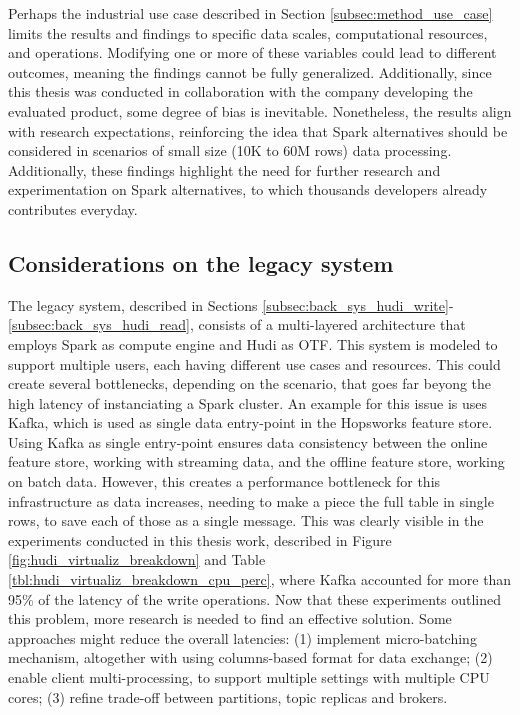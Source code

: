 Perhaps the industrial use case described in Section \ref{subsec:method_use_case} limits the results and findings to specific data scales, computational resources, and operations. Modifying one or more of these variables could lead to different outcomes, meaning the findings cannot be fully generalized. Additionally, since this thesis was conducted in collaboration with the company developing the evaluated product, some degree of bias is inevitable. Nonetheless, the results align with research expectations, reinforcing the idea that Spark alternatives should be considered in scenarios of small size (10K to 60M rows) data processing. Additionally, these findings highlight the need for further research and experimentation on Spark alternatives, to which thousands developers already contributes everyday.



\subsection{Considerations on the legacy system}
The legacy system, described in Sections \ref{subsec:back_sys_hudi_write}-\ref{subsec:back_sys_hudi_read}, consists of a multi-layered architecture that employs Spark as compute engine and Hudi as \gls{OTF}. This system is modeled to support multiple users, each having different use cases and resources. This could create several bottlenecks, depending on the scenario, that goes far beyong the high latency of instanciating a Spark cluster. An example for this issue is uses Kafka, which is used as single data entry-point in the Hopsworks feature store. Using Kafka as single entry-point ensures data consistency between the online feature store, working with streaming data, and the offline feature store, working on batch data. However, this creates a performance bottleneck for this infrastructure as data increases, needing to make a piece the full table in single rows, to save each of those as a single message. This was clearly visible in the experiments conducted in this thesis work, described in Figure \ref{fig:hudi_virtualiz_breakdown} and Table \ref{tbl:hudi_virtualiz_breakdown_cpu_perc}, where Kafka accounted for more than 95\% of the latency of the write operations. Now that these experiments outlined this problem, more research is needed to find an effective solution. Some approaches might reduce the overall latencies: (1) implement micro-batching mechanism, altogether with using columns-based format for data exchange; (2) enable client multi-processing, to support multiple settings with multiple \gls{CPU} cores; (3) refine trade-off between partitions, topic replicas and brokers.



